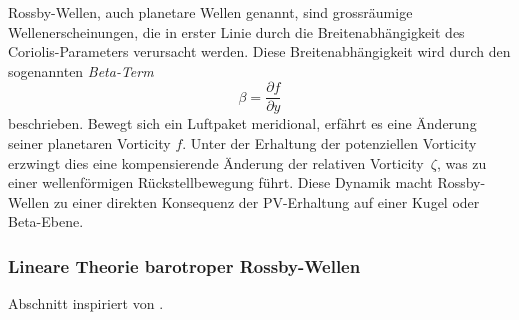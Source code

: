 
Rossby-Wellen, auch planetare Wellen genannt, sind grossräumige
Wellenerscheinungen, die in erster Linie durch die Breitenabhängigkeit des
Coriolis-Parameters verursacht werden. Diese Breitenabhängigkeit wird durch den
sogenannten \emph{Beta-Term}
\begin{equation}
	\beta = \frac{\partial f}{\partial y}
	\label{rossby:eq:beta_term}
\end{equation}
beschrieben. Bewegt sich ein Luftpaket meridional, erfährt es eine Änderung seiner planetaren Vorticity \(f\). Unter der Erhaltung der potenziellen Vorticity erzwingt dies eine kompensierende Änderung der relativen Vorticity~\(\zeta\), was zu einer wellenförmigen Rückstellbewegung führt. Diese Dynamik macht Rossby-Wellen zu einer direkten Konsequenz der PV-Erhaltung auf einer Kugel oder Beta-Ebene.

\subsubsection{Lineare Theorie barotroper Rossby-Wellen}

Abschnitt inspiriert von \cite{rossby:mueller2018}.

